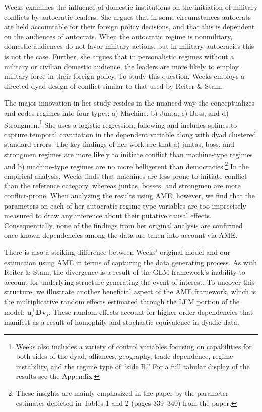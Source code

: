 \documentclass[12pt]{amsart}
\begin{document}
\nocite{weeks:2012} Weeks examines the influence of domestic institutions on the initiation of military conflicts by autocratic leaders. She argues that in some circumstances autocrats are held accountable for their foreign policy decisions, and that this is dependent on the audiences of autocrats. When the autocratic regime is nonmilitary, domestic audiences do not favor military actions, but in military autocracies this is not the case. Further, she argues that in personalistic regimes without a military or civilian domestic audience, the leaders are more likely to employ military force in their foreign policy. To study this question, Weeks employs a directed dyad design of conflict similar to that used by Reiter \& Stam.

The major innovation in her study resides in the nuanced way she conceptualizes and codes regimes into four types: a) Machine, b) Junta, c) Boss, and d) Strongmen.\footnote{Weeks also includes a variety of control variables focusing on capabilities for both sides of the dyad, alliances, geography, trade dependence, regime instability, and the regime type of ``side B.'' For a full tabular display of the results see the Appendix.} She uses a logistic regression, following \citet{beck:etal:1998} and includes splines to capture temporal covariation in the dependent variable along with dyad clustered standard errors. The key findings of her work are that a) juntas, boss, and strongmen regimes are more likely to initiate conflict than machine-type regimes and b) machine-type regimes are no more belligerent than democracies.\footnote{These insights are mainly emphasized in the paper by the parameter estimates depicted in Tables 1 and 2 (pages 339--340) from the paper.} In the empirical analysis, Weeks finds that machines are less prone to initiate conflict than the reference category, whereas juntas, bosses, and strongmen are more conflict-prone. When analyzing the results using AME, however, we find that the parameters on each of her autocratic regime type variables are too imprecisely measured to draw any inference about their putative causal effects. Consequentially, none of the findings from her original analysis are confirmed once known dependencies among the data are taken into account via AME.

There is also a striking difference between Weeks' original model and our estimation using AME in terms of capturing the data generating process. As with Reiter \& Stam, the divergence is a result of the GLM framework's inability to account for underlying structure generating the event of interest. To uncover this structure, we illustrate another beneficial aspect of the AME framework, which is the multiplicative random effects estimated through the LFM portion of the model: $\mathbf{u}_{i}^{\top} \mathbf{D} \mathbf{v}_{j}$. These random effects account for higher order dependencies that manifest as a result of homophily and stochastic equivalence in dyadic data.
\end{document}

